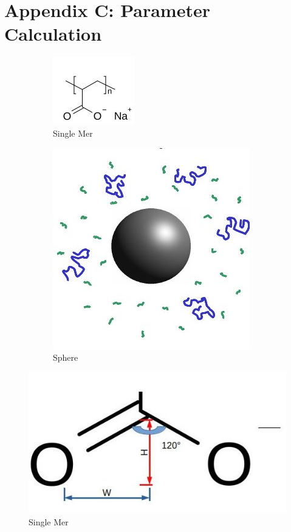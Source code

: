 \documentclass[10pt,letterpaper]{article}
\begin{document}


\newpage
\section*{Appendix C: Parameter Calculation}

\begin{figure}[h!]%
    \centering
    \begin{subfigure}[b]{0.3\textwidth}
        \includegraphics[scale=0.5]{c-c.jpg}
        \caption{Single Mer}
        \label{fig:gull}
    \end{subfigure}
    \begin{subfigure}[b]{0.3\textwidth}
        \includegraphics[scale=0.25]{fig2.jpg}
        \caption{Sphere}
        \label{fig:mouse}
    \end{subfigure}
    \caption{}
\end{figure}

\begin{figure}[h!]
\centering
\includegraphics[scale=0.4]{angles.jpeg}
\caption{Single Mer}
\end{figure}
\end{document}
